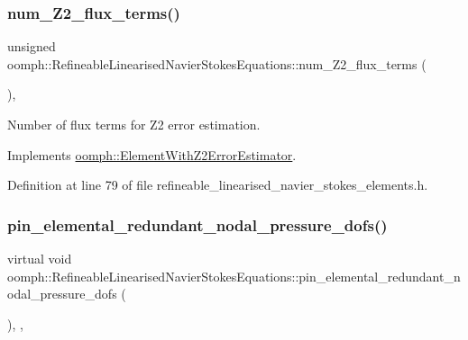 \subsubsection{\texorpdfstring{num\+\_\+\+Z2\+\_\+flux\+\_\+terms()}{num\_Z2\_flux\_terms()}}
{\footnotesize\ttfamily unsigned oomph\+::\+Refineable\+Linearised\+Navier\+Stokes\+Equations\+::num\+\_\+\+Z2\+\_\+flux\+\_\+terms (\begin{DoxyParamCaption}{ }\end{DoxyParamCaption})\hspace{0.3cm}{\ttfamily [inline]}, {\ttfamily [virtual]}}



Number of \textquotesingle{}flux\textquotesingle{} terms for Z2 error estimation. 



Implements \hyperlink{classoomph_1_1ElementWithZ2ErrorEstimator_ae82c5728902e13da31be19c390fc28e3}{oomph\+::\+Element\+With\+Z2\+Error\+Estimator}.



Definition at line 79 of file refineable\+\_\+linearised\+\_\+navier\+\_\+stokes\+\_\+elements.\+h.

\mbox{\label{classoomph_1_1RefineableLinearisedNavierStokesEquations_ab75b06f5beca6c7ce405a9e91a15c708}} 
\subsubsection{\texorpdfstring{pin\+\_\+elemental\+\_\+redundant\+\_\+nodal\+\_\+pressure\+\_\+dofs()}{pin\_elemental\_redundant\_nodal\_pressure\_dofs()}}
{\footnotesize\ttfamily virtual void oomph\+::\+Refineable\+Linearised\+Navier\+Stokes\+Equations\+::pin\+\_\+elemental\+\_\+redundant\+\_\+nodal\+\_\+pressure\+\_\+dofs (\begin{DoxyParamCaption}{ }\end{DoxyParamCaption})\hspace{0.3cm}{\ttfamily [inline]}, {\ttfamily [protected]}, {\ttfamily [virtual]}}




